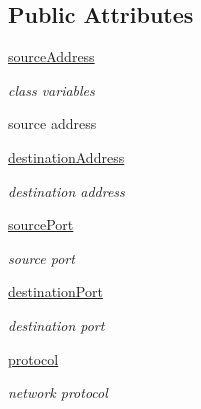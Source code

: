 \subsection*{Public Attributes}
\begin{DoxyCompactItemize}
\item 
\hyperlink{classflowmon-parse-results_1_1FiveTuple_a96a23657f51c64ceecf3530bad2a2573}{source\+Address}
\begin{DoxyCompactList}\small\item\em class variables

source address \end{DoxyCompactList}\item 
\hyperlink{classflowmon-parse-results_1_1FiveTuple_acaa5a4c497bc04e7429e2e30bb5d2da9}{destination\+Address}
\begin{DoxyCompactList}\small\item\em destination address \end{DoxyCompactList}\item 
\hyperlink{classflowmon-parse-results_1_1FiveTuple_a1a880e7cbea1671266c4c48e3655a8a7}{source\+Port}
\begin{DoxyCompactList}\small\item\em source port \end{DoxyCompactList}\item 
\hyperlink{classflowmon-parse-results_1_1FiveTuple_abe1d2214f245803c973729bc0ea1b3bb}{destination\+Port}
\begin{DoxyCompactList}\small\item\em destination port \end{DoxyCompactList}\item 
\hyperlink{classflowmon-parse-results_1_1FiveTuple_a4ed085c9485449c66a351839a0397a23}{protocol}
\begin{DoxyCompactList}\small\item\em network protocol \end{DoxyCompactList}\end{DoxyCompactItemize}
